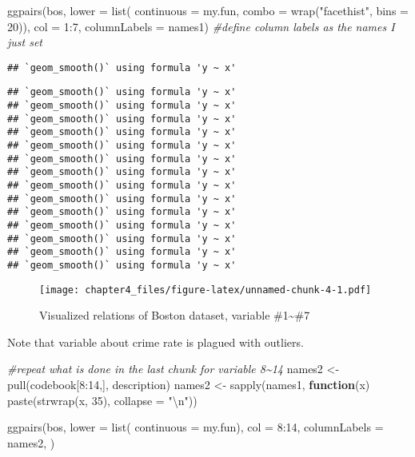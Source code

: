 \documentclass[
]{article}
\newenvironment{Shaded}{\begin{snugshade}}{\end{snugshade}}
\newcommand{\AttributeTok}[1]{\textcolor[rgb]{0.77,0.63,0.00}{#1}}
\newcommand{\CommentTok}[1]{\textcolor[rgb]{0.56,0.35,0.01}{\textit{#1}}}
\newcommand{\ControlFlowTok}[1]{\textcolor[rgb]{0.13,0.29,0.53}{\textbf{#1}}}
\newcommand{\DecValTok}[1]{\textcolor[rgb]{0.00,0.00,0.81}{#1}}
\newcommand{\FunctionTok}[1]{\textcolor[rgb]{0.00,0.00,0.00}{#1}}
\newcommand{\NormalTok}[1]{#1}
\newcommand{\OtherTok}[1]{\textcolor[rgb]{0.56,0.35,0.01}{#1}}
\newcommand{\SpecialCharTok}[1]{\textcolor[rgb]{0.00,0.00,0.00}{#1}}
\newcommand{\StringTok}[1]{\textcolor[rgb]{0.31,0.60,0.02}{#1}}
\begin{document}
\begin{Shaded}
\begin{Highlighting}[]
\FunctionTok{ggpairs}\NormalTok{(bos, }
        \AttributeTok{lower =} \FunctionTok{list}\NormalTok{(}
          \AttributeTok{continuous =}\NormalTok{ my.fun,}
          \AttributeTok{combo =} \FunctionTok{wrap}\NormalTok{(}\StringTok{"facethist"}\NormalTok{, }\AttributeTok{bins =} \DecValTok{20}\NormalTok{)),}
        \AttributeTok{col =} \DecValTok{1}\SpecialCharTok{:}\DecValTok{7}\NormalTok{,}
        \AttributeTok{columnLabels =}\NormalTok{ names1) }\CommentTok{\#define column labels as the names I just set}
\end{Highlighting}
\end{Shaded}

\begin{verbatim}
## `geom_smooth()` using formula 'y ~ x'
\end{verbatim}

\begin{verbatim}
## `geom_smooth()` using formula 'y ~ x'
## `geom_smooth()` using formula 'y ~ x'
## `geom_smooth()` using formula 'y ~ x'
## `geom_smooth()` using formula 'y ~ x'
## `geom_smooth()` using formula 'y ~ x'
## `geom_smooth()` using formula 'y ~ x'
## `geom_smooth()` using formula 'y ~ x'
## `geom_smooth()` using formula 'y ~ x'
## `geom_smooth()` using formula 'y ~ x'
## `geom_smooth()` using formula 'y ~ x'
## `geom_smooth()` using formula 'y ~ x'
## `geom_smooth()` using formula 'y ~ x'
## `geom_smooth()` using formula 'y ~ x'
## `geom_smooth()` using formula 'y ~ x'
\end{verbatim}

\begin{figure}
\centering
\texttt{[image: chapter4\_files/figure-latex/unnamed-chunk-4-1.pdf]}
\caption{Visualized relations of Boston dataset, variable
\#1\textasciitilde\#7}
\end{figure}

Note that variable about crime rate is plagued with outliers.

\begin{Shaded}
\begin{Highlighting}[]
\CommentTok{\#repeat what is done in the last chunk for variable 8\textasciitilde{}14}
\NormalTok{names2 }\OtherTok{\textless{}{-}} \FunctionTok{pull}\NormalTok{(codebook[}\DecValTok{8}\SpecialCharTok{:}\DecValTok{14}\NormalTok{,], description)}
\NormalTok{names2 }\OtherTok{\textless{}{-}} \FunctionTok{sapply}\NormalTok{(names1, }\ControlFlowTok{function}\NormalTok{(x) }\FunctionTok{paste}\NormalTok{(}\FunctionTok{strwrap}\NormalTok{(x, }\DecValTok{35}\NormalTok{), }\AttributeTok{collapse =} \StringTok{"}\SpecialCharTok{\textbackslash{}n}\StringTok{"}\NormalTok{))}

\FunctionTok{ggpairs}\NormalTok{(bos, }
        \AttributeTok{lower =} \FunctionTok{list}\NormalTok{(}
          \AttributeTok{continuous =}\NormalTok{ my.fun),}
        \AttributeTok{col =} \DecValTok{8}\SpecialCharTok{:}\DecValTok{14}\NormalTok{,}
        \AttributeTok{columnLabels =}\NormalTok{ names2,}
\NormalTok{        )}
\end{Highlighting}
\end{Shaded}
\end{document}
